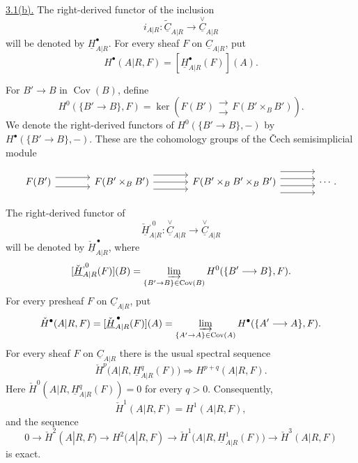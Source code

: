 \underline{3.1(b).} The right-derived functor of the inclusion
\[
 i_{A|R}:\widetilde{\underline C}_{A|R}
 \longrightarrow\overset{\vee}{\underline C}_{A|R}
\]
will be denoted by $\underline H^{\bullet}_{A|R}$. For every sheaf
$F$ on $\underline C_{A|R}$, put
\[
 H^{\bullet}(A|R,F)=
 [\underline H^{\bullet}_{A|R}(F)](A).
\]

For $B'\longrightarrow B$ in $\operatorname{Cov}(B)$, define
\[
 H^0(\{B'\longrightarrow B\},F)=
 \ker\!\left(
 F(B')\mathrel{\substack{\longrightarrow\\[-.6ex]\longrightarrow}}
 F(B'\mathbin{\times_B}B')
 \right).
\]
We denote the right-derived functors of
$H^0(\{B'\longrightarrow B\},-)$ by
$H^{\bullet}(\{B'\longrightarrow B\},-)$. These are the cohomology
groups of the \v{C}ech semisimplicial module


\[
\begin{tikzcd}[column sep=large]
 F(B')
   \arrow[r,shift left=2] \arrow[r,shift right=2]
 & F(B'\times_BB')
   \arrow[r,shift left=3] \arrow[r] \arrow[r,shift right=3]
 & F(B'\times_BB'\times_BB')
   \arrow[r,shift left=4.5] \arrow[r,shift left=1.5]
   \arrow[r,shift right=1.5] \arrow[r,shift right=4.5]
 & \cdots .
\end{tikzcd}
\]

The right-derived functor of
\[
 \check{\underline H}^{,0}_{A|R}:
 \overset{\vee}{\underline C}_{A|R}
 \longrightarrow\overset{\vee}{\underline C}_{A|R}
\]
will be denoted by $\check{\underline H}^{\,\bullet}_{A|R}$, where
\[
 [\check{\underline H}^{,0}_{A|R}(F)](B)=
 \varinjlim_{\{B'\to B\}\in\operatorname{Cov}(B)}
 H^0(\{B'\longrightarrow B\},F).
\]
For every presheaf $F$ on $\underline C_{A|R}$, put
\[
 \check H^{\bullet}(A|R,F)=
 [\check{\underline H}^{\,\bullet}_{A|R}(F)](A)=
 \varinjlim_{\{A'\to A\}\in\operatorname{Cov}(A)}
 H^{\bullet}(\{A'\longrightarrow A\},F).
\]
For every sheaf $F$ on $\underline C_{A|R}$ there is the usual
spectral sequence
\[
 \check H^p\bigl(A|R,\underline H^q_{A|R}(F)\bigr)
 \Longrightarrow H^{p+q}(A|R,F).
\]
Here
$\check H^0(A|R,\underline H^q_{A|R}(F))=0$ for every $q>0$.
Consequently,
\[
 \check H^1(A|R,F)=H^1(A|R,F),
\]
and the sequence
\[
 0\longrightarrow\check H^2(A|R,F)
 \longrightarrow H^2(A|R,F)
 \longrightarrow
 \check H^1\bigl(A|R,\underline H^1_{A|R}(F)\bigr)
 \longrightarrow\check H^3(A|R,F)
\]
is exact.
